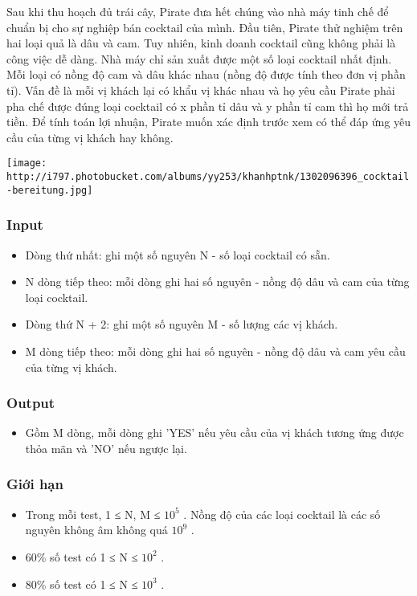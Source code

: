 



   Sau khi thu hoạch đủ trái cây, Pirate đưa hết chúng vào nhà máy tinh chế để chuẩn bị cho sự nghiệp bán cocktail của mình. Đầu tiên, Pirate thử nghiệm trên hai loại quả là dâu và cam. Tuy nhiên, kinh doanh cocktail cũng không phải là công việc dễ dàng. Nhà máy chỉ sản xuất được một số loại cocktail nhất định. Mỗi loại có nồng độ cam và dâu khác nhau (nồng độ được tính theo đơn vị phần tỉ). Vấn đề là mỗi vị khách lại có khẩu vị khác nhau và họ yêu cầu Pirate phải pha chế được đúng loại cocktail có x phần tỉ dâu và y phần tỉ cam thì họ mới trả tiền. Để tính toán lợi nhuận, Pirate muốn xác định trước xem có thể đáp ứng yêu cầu của từng vị khách hay không.  


\texttt{[image: http://i797.photobucket.com/albums/yy253/khanhptnk/1302096396\_cocktail-bereitung.jpg]}

\subsubsection{   Input  }
\begin{itemize}
	\item     Dòng thứ nhất: ghi một số nguyên N - số loại cocktail có sẵn.   
	\item     N dòng tiếp theo: mỗi dòng ghi hai số nguyên - nồng độ dâu và cam của từng loại cocktail.   
	\item     Dòng thứ N + 2: ghi một số nguyên M - số lượng các vị khách.   
	\item     M dòng tiếp theo: mỗi dòng ghi hai số nguyên - nồng độ dâu và cam yêu cầu của từng vị khách.   
\end{itemize}

\subsubsection{   Output  }
\begin{itemize}
	\item     Gồm M dòng, mỗi dòng ghi 'YES' nếu yêu cầu của vị khách tương ứng được thỏa mãn và 'NO' nếu ngược lại.   
\end{itemize}

\subsubsection{   Giới hạn  }
\begin{itemize}
	\item     Trong mỗi test, 1 ≤ N, M ≤ $10^{5}$    . Nồng độ của các loại cocktail là các số nguyên không âm không quá $10^{9}$    .   
	\item     60\% số test có 1 ≤ N ≤ $10^{2}$    .   
	\item     80\% số test có 1 ≤ N ≤ $10^{3}$    .   
\end{itemize}

